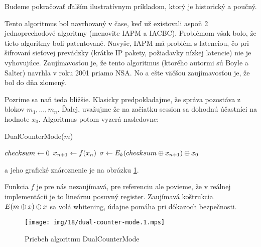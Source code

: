 Budeme pokračovať ďalším ilustratívnym príkladom, ktorý je historický
a poučný.
\begin{priklad}
    Tento algoritmus bol navrhovaný v čase, keď už existovali aspoň 2
    jednoprechodové algoritmy (menovite IAPM a IACBC). Problémom však
    bolo, že tieto algoritmy boli patentované. Navyše, IAPM má problém
    s latenciou, čo pri šifrovaní sieťovej prevádzky (krátke IP
    pakety, požiadavky nízkej latencie) nie je vyhovujúce.
    Zaujímavosťou je, že tento algoritmus (ktorého autormi sú Boyle a
    Salter) navrhla v roku 2001 priamo NSA. No a ešte väčšou
    zaujímavosťou je, že bol do dňa zlomený.

    Pozrime sa naň teda bližšie. Klasicky predpokladajme, že správa
    pozostáva z blokov $m_1, \dots, m_n$. Ďalej, uvažujme že na
    začiatku session  sa dohodnú účastníci na hodnote $x_0$.
    Algoritmus potom vyzerá nasledovne:

    \begin{procedure}[H]
        \caption{DualCounterMode($m$)}
        $checksum \leftarrow 0$\;
        $x_{n+1} \leftarrow f(x_n)$\;
        $\sigma \leftarrow E_k(checksum \oplus x_{n+1}) \oplus x_0$\;
    \end{procedure}
    a jeho grafické znároznenie je na obrázku \ref{fig:dcm}.

    Funkcia $f$ je pre nás nezaujímavá, pre referenciu ale povieme, že
    v reálnej implementácii je to lineárnu posuvný register.
    Zaujímavá koštrukcia $E(m \oplus x) \oplus x$ sa volá whitening,
    údajne pomáha pri dôkazoch bezpečnosti.
    \begin{figure}
        \centering
        \texttt{[image: img/18/dual-counter-mode.1.mps]}
        \caption{Priebeh algoritmu DualCounterMode}
        \label{fig:dcm}
    \end{figure}
\end{priklad}

